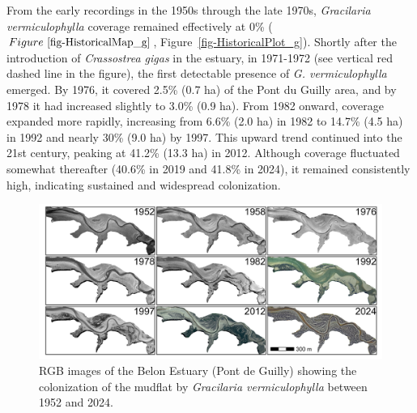 \documentclass[
  letterpaper,
  11pt,
  english,
  singlespacing,
  headsepline]{MastersDoctoralThesis}
\begin{document}
\begin{spacing}{1.5}
From the early recordings in the 1950s through the late 1970s,
\emph{Gracilaria vermiculophylla} coverage remained effectively at 0\%
(\(Figure~\ref{fig-HistoricalMap_g}\),
Figure~\ref{fig-HistoricalPlot_g}). Shortly after the introduction of
\emph{Crassostrea gigas} in the estuary, in 1971-1972 (see vertical red
dashed line in the figure), the first detectable presence of \emph{G.
vermiculophylla} emerged. By 1976, it covered 2.5\% (0.7 ha) of the Pont
du Guilly area, and by 1978 it had increased slightly to 3.0\% (0.9 ha).
From 1982 onward, coverage expanded more rapidly, increasing from 6.6\%
(2.0 ha) in 1982 to 14.7\% (4.5 ha) in 1992 and nearly 30\% (9.0 ha) by
1997. This upward trend continued into the 21st century, peaking at
41.2\% (13.3 ha) in 2012. Although coverage fluctuated somewhat
thereafter (40.6\% in 2019 and 41.8\% in 2024), it remained consistently
high, indicating sustained and widespread colonization.

\newpage

\begin{landscape}
\begin{figure}[ht]
    \centering
    \includegraphics[width=\linewidth]{Chapter4/Figs/Historical_maps.png}
    \caption{\label{fig-HistoricalMap_g}RGB images of the Belon Estuary (Pont de Guilly) showing the colonization of the mudflat by \textit{Gracilaria vermiculophylla} between 1952 and 2024.}
\end{figure}

\end{landscape}

\newpage

\begin{figure}

\end{figure}
\end{spacing}
\end{document}
